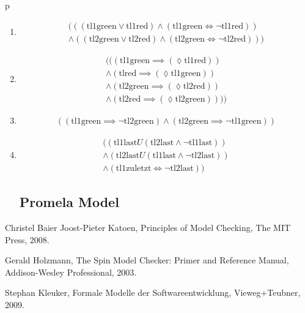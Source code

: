 p\documentclass[a4paper, twoside]{article}
\begin{document}
\begin{enumerate}
\item 
  \begin{multline}
    (((\text{tl1green} \lor \text{tl1red}) \land (\text{tl1green}\iff \neg \text{tl1red})) \\ \land((\text{tl2green} \lor \text{tl2red})\land (\text{tl2green} \iff \neg \text{tl2red})))
  \end{multline}
\item
  \begin{multline}
    \label{eq:unnumbered}
    (((\text{tl1green} \implies (\lozenge \text{tl1red})) \\
    \land (\text{tlred} \implies (\lozenge \text{tl1green}))\\
    \land (\text{tl2green} \implies (\lozenge \text{tl2red})) \\
    \land (\text{tl2red} \implies (\lozenge \text{tl2green}))))
  \end{multline}
\item
  \begin{multline}
    \label{eq:unnumbered}
    ((\text{tl1green} \implies \neg \text{tl2green}) \land (\text{tl2green} \implies \neg \text{tl1green}))
  \end{multline}
\item
  \begin{multline}
    \label{eq:unnumbered}
    ((\text{tl1last} U(\text{tl2last} \land \neg \text{tl1last})) \\
    \land (\text{tl2last} U (\text{tl1last} \land \neg \text{tl2last}))\\
\land(\text{tl1zuletzt} \iff \neg \text{tl2last}))
  \end{multline}

\subsection{Promela Model}
\label{sec:trafficlightsmodel}



\end{enumerate}


\appendix

\begin{thebibliography}{9}
Christel Baier Joost-Pieter Katoen,
Principles of Model Checking,
The MIT Press,
2008.

Gerald Holzmann,
The Spin Model Checker: Primer and Reference Manual,
Addison-Wesley Professional,
2003.

Stephan Kleuker,
Formale Modelle der Softwareentwicklung,
Vieweg+Teubner,
2009.

\end{thebibliography}
\end{document}
